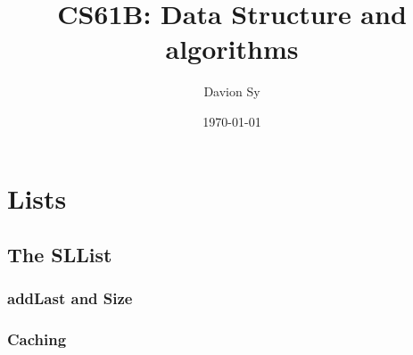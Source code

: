\documentclass[utf8]{book}
\title{CS61B: Data Structure and algorithms}
\author{Davion Sy}
\date{\today}
\begin{document}
    \maketitle
    \tableofcontents
    
    \chapter{Lists}
    \section{The SLList}
    \subsection{addLast and Size}
    \subsection{Caching} 
\end{document}
